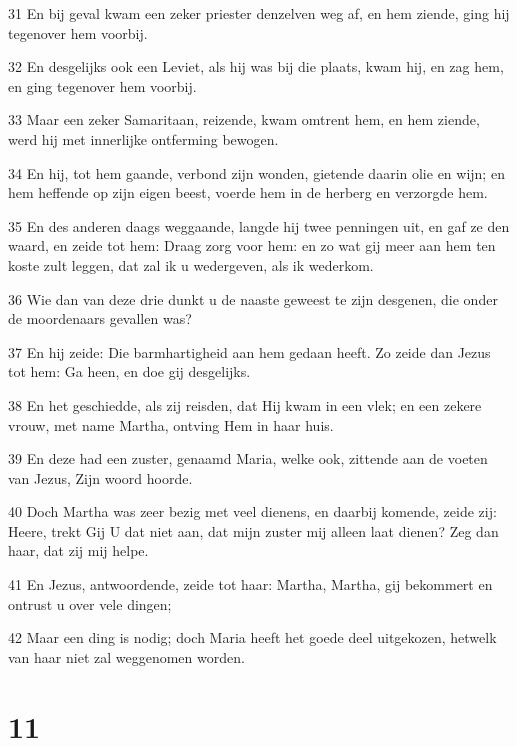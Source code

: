 \par 31 En bij geval kwam een zeker priester denzelven weg af, en hem ziende, ging hij tegenover hem voorbij.
\par 32 En desgelijks ook een Leviet, als hij was bij die plaats, kwam hij, en zag hem, en ging tegenover hem voorbij.
\par 33 Maar een zeker Samaritaan, reizende, kwam omtrent hem, en hem ziende, werd hij met innerlijke ontferming bewogen.
\par 34 En hij, tot hem gaande, verbond zijn wonden, gietende daarin olie en wijn; en hem heffende op zijn eigen beest, voerde hem in de herberg en verzorgde hem.
\par 35 En des anderen daags weggaande, langde hij twee penningen uit, en gaf ze den waard, en zeide tot hem: Draag zorg voor hem: en zo wat gij meer aan hem ten koste zult leggen, dat zal ik u wedergeven, als ik wederkom.
\par 36 Wie dan van deze drie dunkt u de naaste geweest te zijn desgenen, die onder de moordenaars gevallen was?
\par 37 En hij zeide: Die barmhartigheid aan hem gedaan heeft. Zo zeide dan Jezus tot hem: Ga heen, en doe gij desgelijks.
\par 38 En het geschiedde, als zij reisden, dat Hij kwam in een vlek; en een zekere vrouw, met name Martha, ontving Hem in haar huis.
\par 39 En deze had een zuster, genaamd Maria, welke ook, zittende aan de voeten van Jezus, Zijn woord hoorde.
\par 40 Doch Martha was zeer bezig met veel dienens, en daarbij komende, zeide zij: Heere, trekt Gij U dat niet aan, dat mijn zuster mij alleen laat dienen? Zeg dan haar, dat zij mij helpe.
\par 41 En Jezus, antwoordende, zeide tot haar: Martha, Martha, gij bekommert en ontrust u over vele dingen;
\par 42 Maar een ding is nodig; doch Maria heeft het goede deel uitgekozen, hetwelk van haar niet zal weggenomen worden.

\chapter{11}

